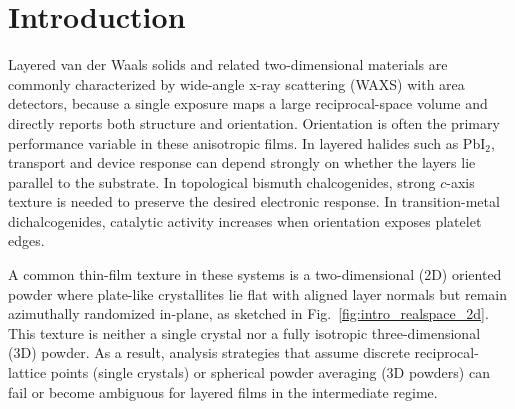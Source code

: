 \section{Introduction}
Layered van der Waals solids and related two-dimensional materials are commonly characterized by wide-angle x-ray scattering (WAXS) with area detectors, because a single exposure maps a large reciprocal-space volume and directly reports both structure and orientation.\cite{SmilgiesBlasini2007,Smilgies2009,Hexemer2015,Smilgies2025Crystals,Savikhin2020} Orientation is often the primary performance variable in these anisotropic films.\cite{Novoselov2004,GeimGrigorieva2013,Fischer2023MOFWAXS} In layered halides such as PbI$_2$, transport and device response can depend strongly on whether the layers lie parallel to the substrate.\cite{Arendse2023} In topological bismuth chalcogenides, strong $c$-axis texture is needed to preserve the desired electronic response.\cite{Jerng2013} In transition-metal dichalcogenides, catalytic activity increases when orientation exposes platelet edges.\cite{Li2011}

A common thin-film texture in these systems is a two-dimensional (2D) oriented powder where plate-like crystallites lie flat with aligned layer normals but remain azimuthally randomized in-plane, as sketched in Fig.~\ref{fig:intro_realspace_2d}.\cite{Kaganer1999,Smilgies2000POPOP,Fischer2023MOFWAXS} This texture is neither a single crystal nor a fully isotropic three-dimensional (3D) powder. As a result, analysis strategies that assume discrete reciprocal-lattice points (single crystals) or spherical powder averaging (3D powders) can fail or become ambiguous for layered films in the intermediate regime.\cite{Kaganer1999}



